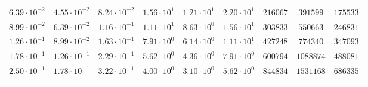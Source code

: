 \begin{tabular}{c c c c c c c c c}
$6.39{\cdot} 10^{-2}$ & $4.55{\cdot} 10^{-2}$ & $8.24{\cdot} 10^{-2}$ & $1.56{\cdot} 10^{1}$ & $1.21{\cdot} 10^{1}$ & $2.20{\cdot} 10^{1}$ & $    216067$ & $    391599$ & $ 175533$\\
$8.99{\cdot} 10^{-2}$ & $6.39{\cdot} 10^{-2}$ & $1.16{\cdot} 10^{-1}$ & $1.11{\cdot} 10^{1}$ & $8.63{\cdot} 10^{0}$ & $1.56{\cdot} 10^{1}$ & $    303833$ & $    550663$ & $ 246831$\\
$1.26{\cdot} 10^{-1}$ & $8.99{\cdot} 10^{-2}$ & $1.63{\cdot} 10^{-1}$ & $7.91{\cdot} 10^{0}$ & $6.14{\cdot} 10^{0}$ & $1.11{\cdot} 10^{1}$ & $    427248$ & $    774340$ & $ 347093$\\
$1.78{\cdot} 10^{-1}$ & $1.26{\cdot} 10^{-1}$ & $2.29{\cdot} 10^{-1}$ & $5.62{\cdot} 10^{0}$ & $4.36{\cdot} 10^{0}$ & $7.91{\cdot} 10^{0}$ & $    600794$ & $   1088874$ & $ 488081$\\
$2.50{\cdot} 10^{-1}$ & $1.78{\cdot} 10^{-1}$ & $3.22{\cdot} 10^{-1}$ & $4.00{\cdot} 10^{0}$ & $3.10{\cdot} 10^{0}$ & $5.62{\cdot} 10^{0}$ & $    844834$ & $   1531168$ & $ 686335$\\
\hline \\
\end{tabular}
